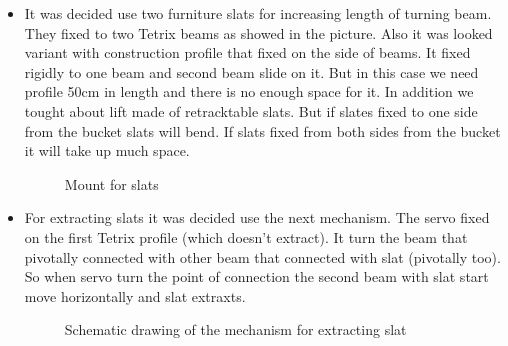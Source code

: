 \begin{itemize}
\item It was decided use two furniture slats for increasing length of turning beam. They fixed to two Tetrix beams as showed in the picture. Also it was looked variant with construction profile that fixed on the side of beams. It fixed rigidly to one beam and second beam slide on it. But in this case we need profile 50cm in length and there is no enough space for it. In addition we tought about lift made of retracktable slats. But if slates fixed to one side from the bucket slats will bend. If slats fixed from both sides from the bucket it will take up much space.
\begin{figure}[H]
	\begin{minipage}[h]{\linewidth}
		\caption{Mount for slats}
	\end{minipage}
\end{figure} 
\item For extracting slats it was decided use the next mechanism. The servo fixed on the first Tetrix profile (which doesn't extract). It turn the beam that pivotally connected with other beam that connected with slat (pivotally too). So when servo turn the point of connection the second beam with slat start move horizontally and slat extraxts. 
\begin{figure}[H]
	\begin{minipage}[h]{\linewidth}
		\caption{Schematic drawing of the mechanism for extracting slat}
	\end{minipage}
\end{figure}


\end{itemize}
